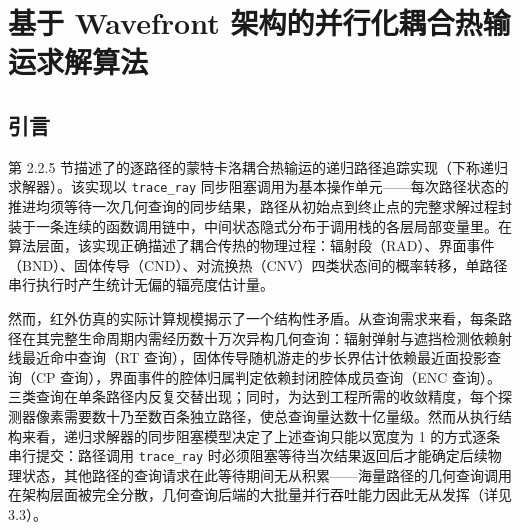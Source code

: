 
%
%
\chapter{基于 Wavefront 架构的并行化耦合热输运求解算法}
\label{chap:solver}

\section{引言}

第 2.2.5 节描述了的逐路径的蒙特卡洛耦合热输运的递归路径追踪实现（下称递归求解器）。该实现以 \texttt{trace\_ray} 同步阻塞调用为基本操作单元——每次路径状态的推进均须等待一次几何查询的同步结果，路径从初始点到终止点的完整求解过程封装于一条连续的函数调用链中，中间状态隐式分布于调用栈的各层局部变量里。在算法层面，该实现正确描述了耦合传热的物理过程：辐射段（RAD）、界面事件（BND）、固体传导（CND）、对流换热（CNV）四类状态间的概率转移，单路径串行执行时产生统计无偏的辐亮度估计量。

然而，红外仿真的实际计算规模揭示了一个结构性矛盾。从查询需求来看，每条路径在其完整生命周期内需经历数十万次异构几何查询：辐射弹射与遮挡检测依赖射线最近命中查询（RT 查询），固体传导随机游走的步长界估计依赖最近面投影查询（CP 查询），界面事件的腔体归属判定依赖封闭腔体成员查询（ENC 查询）。三类查询在单条路径内反复交替出现；同时，为达到工程所需的收敛精度，每个探测器像素需要数十乃至数百条独立路径，使总查询量达数十亿量级。然而从执行结构来看，递归求解器的同步阻塞模型决定了上述查询只能以宽度为 1 的方式逐条串行提交：路径调用 \texttt{trace\_ray} 时必须阻塞等待当次结果返回后才能确定后续物理状态，其他路径的查询请求在此等待期间无从积累——海量路径的几何查询调用在架构层面被完全分散，几何查询后端的大批量并行吞吐能力因此无从发挥（详见3.3）。

